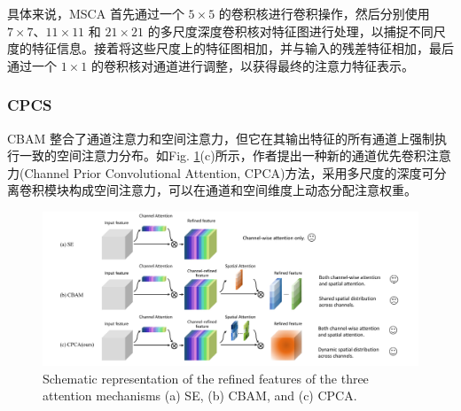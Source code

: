\documentclass[a4paper]{ctexart}
\begin{document}
	具体来说，MSCA 首先通过一个 $5 \times 5$ 的卷积核进行卷积操作，然后分别使用 $7 \times 7$、$11 \times 11$ 和 $21 \times 21$ 的多尺度深度卷积核对特征图进行处理，以捕捉不同尺度的特征信息。接着将这些尺度上的特征图相加，并与输入的残差特征相加，最后通过一个 $1 \times 1$ 的卷积核对通道进行调整，以获得最终的注意力特征表示。
	
	\subsubsection*{CPCS}
	
	
	CBAM 整合了通道注意力和空间注意力，但它在其输出特征的所有通道上强制执行一致的空间注意力分布。如Fig. \ref{fig: SE_CBAM_CPCA}(c)所示，作者\cite{huang2023channel}提出一种新的通道优先卷积注意力(Channel Prior Convolutional Attention, CPCA)方法，采用多尺度的深度可分离卷积模块构成空间注意力，可以在通道和空间维度上动态分配注意权重。
	
	\begin{figure}[htbp]
		\centering
		\includegraphics[width=0.8\linewidth]{picture/LLIE/Experiment/Attention/SE_CBAM_CPCA}
		\caption{Schematic representation of the refined features of the three attention mechanisms (a) SE, (b) CBAM, and (c) CPCA.}
		\label{fig: SE_CBAM_CPCA}
	\end{figure}
	
\end{document}

